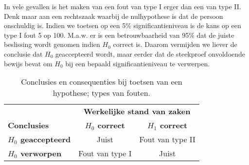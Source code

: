 In vele gevallen is het maken van een fout van type I erger dan een van type II. Denk maar aan een rechtszaak waarbij de nulhypothese is dat de persoon onschuldig is. Indien we toetsen op een 5\% significantieniveau is de kans op een type I fout 5 op 100. M.a.w. er is een betrouwbaarheid van 95\% dat de juiste beslissing wordt genomen indien $H_{0}$ correct is. Daarom vermijden we liever de conclusie dat $H_{0}$ geaccepteerd wordt, maar eerder dat de steekproef onvoldoende bewijs bevat om $H_{0}$ bij een bepaald significantieniveau te verwerpen.

\begin{table}[h]
  \centering
    \begin{tabular}{@{}l|cc@{}}
      \toprule
      & \multicolumn{2}{c}{\textbf{Werkelijke stand van zaken}} \\
      \textbf{Conclusies}          & \textbf{$H_{0}$ correct} & \textbf{$H_{1}$ correct}     \\
      \midrule
      \textbf{$H_{0}$ geaccepteerd}& Juist                    & Fout van type II \\
      \textbf{$H_{0}$ verworpen}   & Fout van type I          & Juist            \\
      \bottomrule
    \end{tabular}
  \caption{Conclusies en consequenties bij toetsen van een hypothese; types van fouten.}
  \label{tab:hypfouten}
\end{table}

